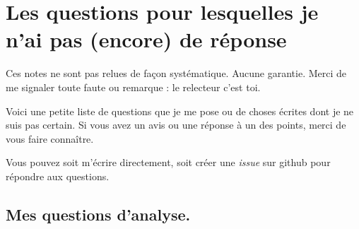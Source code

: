 

\section{Les questions pour lesquelles je n'ai pas (encore) de réponse}
\label{SecooCKWWooBFgnea}

Ces notes ne sont pas relues de façon systématique. Aucune garantie. Merci de me signaler toute faute ou remarque : le relecteur c'est toi.

Voici une petite liste de questions que je me pose ou de choses écrites dont je ne suis pas certain. Si vous avez un avis ou une réponse à un des points, merci de vous faire connaître.

Vous pouvez soit m'écrire directement, soit créer une \emph{issue} sur github pour répondre aux questions.

\subsection{Mes questions d'analyse.}

